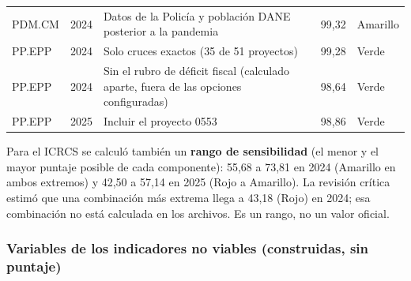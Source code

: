 \documentclass[11pt,letterpaper]{article}
\begin{document}
{\begin{xltabular}{\linewidth}{L{2.33cm}L{1.13cm}L{7.55cm}L{1.90cm}L{2.58cm}}
PDM.CM & 2024 & Datos de la Policía y población DANE posterior a la pandemia & 99,32 & Amarillo \\
PP.EPP & 2024 & Solo cruces exactos (35 de 51 proyectos) & 99,28 & Verde \\
PP.EPP & 2024 & Sin el rubro de déficit fiscal (calculado aparte, fuera de las opciones configuradas) & 98,64 & Verde \\
PP.EPP & 2025 & Incluir el proyecto 0553 & 98,86 & Verde \\
\end{xltabular}
}

Para el ICRCS se calculó también un \textbf{rango de sensibilidad} (el menor y el mayor puntaje posible de cada componente): 55,68 a 73,81 en 2024 (Amarillo en ambos extremos) y 42,50 a 57,14 en 2025 (Rojo a Amarillo). La revisión crítica estimó que una combinación más extrema llega a 43,18 (Rojo) en 2024; esa combinación no está calculada en los archivos. Es un rango, no un valor oficial.

\subsubsection*{Variables de los indicadores no viables (construidas, sin puntaje)}
\end{document}
